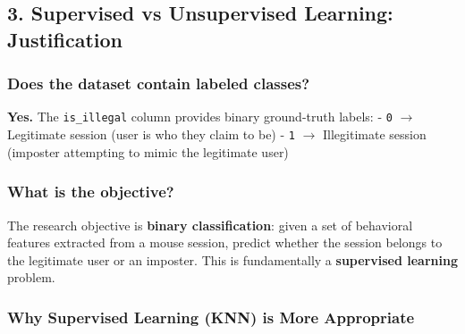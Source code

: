 \documentclass[11pt]{article}
\begin{document}
    \subsection{3. Supervised vs Unsupervised Learning:
Justification}\label{supervised-vs-unsupervised-learning-justification}

\subsubsection{Does the dataset contain labeled
classes?}\label{does-the-dataset-contain-labeled-classes}

\textbf{Yes.} The \texttt{is\_illegal} column provides binary
ground-truth labels: - \texttt{0} $\rightarrow$ Legitimate session (user is who they
claim to be) - \texttt{1} $\rightarrow$ Illegitimate session (imposter attempting to
mimic the legitimate user)

\subsubsection{What is the objective?}\label{what-is-the-objective}

The research objective is \textbf{binary classification}: given a set of
behavioral features extracted from a mouse session, predict whether the
session belongs to the legitimate user or an imposter. This is
fundamentally a \textbf{supervised learning} problem.

\subsubsection{Why Supervised Learning (KNN) is More
Appropriate}\label{why-supervised-learning-knn-is-more-appropriate}
\end{document}
